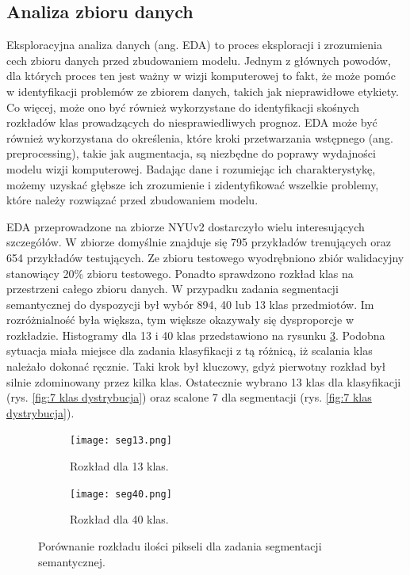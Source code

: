 \subsection{Analiza zbioru danych}
Eksploracyjna analiza danych (ang. EDA) to proces eksploracji i zrozumienia cech zbioru danych przed zbudowaniem modelu. Jednym z głównych powodów, dla których proces ten jest ważny w wizji komputerowej to fakt, że może pomóc w identyfikacji problemów ze zbiorem danych, takich jak nieprawidłowe etykiety. Co więcej, może ono być również wykorzystane do identyfikacji skośnych rozkładów klas prowadzących do niesprawiedliwych prognoz. EDA może być również wykorzystana do określenia, które kroki przetwarzania wstępnego (ang. preprocessing), takie jak augmentacja, są niezbędne do poprawy wydajności modelu wizji komputerowej. Badając dane i rozumiejąc ich charakterystykę, możemy uzyskać głębsze ich zrozumienie i zidentyfikować wszelkie problemy, które należy rozwiązać przed zbudowaniem modelu.

EDA przeprowadzone na zbiorze NYUv2 dostarczyło wielu interesujących szczegółów. W zbiorze domyślnie znajduje się 795 przykładów trenujących oraz 654 przykładów testujących. Ze zbioru testowego wyodrębniono zbiór walidacyjny stanowiący 20\% zbioru testowego. Ponadto sprawdzono rozkład klas na przestrzeni całego zbioru danych.
W przypadku zadania segmentacji semantycznej do dyspozycji był wybór 894, 40 lub 13 klas przedmiotów. Im rozróżnialność była większa, tym większe okazywały się dysproporcje w rozkładzie. Histogramy dla 13 i 40 klas przedstawiono na rysunku \ref{fig:rozklad-segm}.
Podobna sytuacja miała miejsce dla zadania klasyfikacji z tą różnicą, iż scalania klas należało dokonać ręcznie. Taki krok był kluczowy, gdyż pierwotny rozkład był silnie zdominowany przez kilka klas.
Ostatecznie wybrano 13 klas dla klasyfikacji (rys. \ref{fig:7 klas dystrybucja}) oraz scalone 7 dla segmentacji (rys. \ref{fig:7 klas dystrybucja}).

\begin{figure}[ht!]
\centering
\begin{subfigure}[b]{0.49\textwidth}
\centering
\texttt{[image: seg13.png]}
\caption{Rozkład dla 13 klas.}
\label{fig:rozklad-13klas-seg}
\end{subfigure}
\hfill
\begin{subfigure}[b]{0.49\textwidth}
\centering
\texttt{[image: seg40.png]}
\caption{Rozkład dla 40 klas.}
\label{fig:rozklad-40klas-seg}
\end{subfigure}
\caption[]{Porównanie rozkładu ilości pikseli dla zadania segmentacji semantycznej.}
\label{fig:rozklad-segm}
\end{figure}

